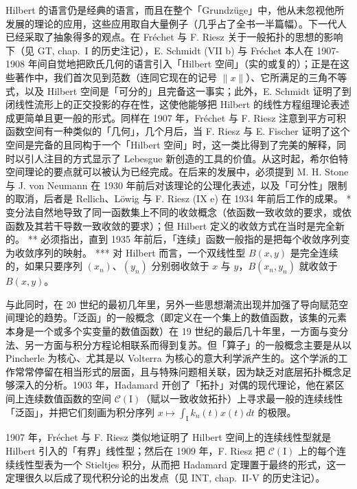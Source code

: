 Hilbert 的语言仍是经典的语言，而且在整个「Grundzüge」中，他从未忽视他所发展的理论的应用，这些应用取自大量例子（几乎占了全书一半篇幅）。下一代人已经采取了抽象得多的观点。在 Fréchet 与 F. Riesz 关于一般拓扑的思想的影响下（见 GT, chap.~I 的历史注记），E. Schmidt (VII b) 与 Fréchet 本人在 1907-1908 年间自觉地把欧氏几何的语言引入「Hilbert 空间」（实的或复的）；正是在这些著作中，我们首次见到范数（连同它现在的记号 \(\| x \|\)）、它所满足的三角不等式，以及 Hilbert 空间是「可分的」且完备这一事实；此外，E. Schmidt 证明了到闭线性流形上的正交投影的存在性，这使他能够把 Hilbert 的线性方程组理论表述成更简单且更一般的形式。同样在 1907 年，Fréchet 与 F. Riesz 注意到平方可积函数空间有一种类似的「几何」，几个月后，当 F. Riesz 与 E. Fischer 证明了这个空间是完备的且同构于一个「Hilbert 空间」时，这一类比得到了完美的解释，同时以引人注目的方式显示了 Lebesgue 新创造的工具的价值。从这时起，希尔伯特空间理论的要点就可以被认为已经完成。在后来的发展中，必须提到 M. H. Stone 与 J. von Neumann 在 1930 年前后对该理论的公理化表述，以及「可分性」限制的取消，后者是 Rellich、Löwig 与 F. Riesz (IX e) 在 1934 年前后工作的成果。
* 变分法自然地导致了同一函数集上不同的收敛概念（依函数一致收敛的要求，或依函数及其若干导数一致收敛的要求）；但 Hilbert 定义的收敛方式在当时是完全新的。
** 必须指出，直到 1935 年前后，「连续」函数一般指的是把每个收敛序列变为收敛序列的映射。
*** 对 Hilbert 而言，一个双线性型 \(B(x, y)\) 是完全连续的，如果只要序列 \((x_{n})\)、\((y_{n})\) 分别弱收敛于 \(x\) 与 \(y\)，\(B(x_{n}, y_{n})\) 就收敛于 \(B(x, y)\)。

与此同时，在 20 世纪的最初几年里，另外一些思想潮流出现并加强了导向赋范空间理论的趋势。「泛函」的一般概念（即定义在一个集上的数值函数，该集的元素本身是一个或多个实变量的数值函数）在 19 世纪的最后几十年里，一方面与变分法、另一方面与积分方程论相联系而得到复苏。但「算子」的一般概念主要是从以 Pincherle 为核心、尤其是以 Volterra 为核心的意大利学派产生的。这个学派的工作常常停留在相当形式的层面，且与特殊问题相关联，因为缺乏对底层拓扑概念足够深入的分析。1903 年，Hadamard 开创了「拓扑」对偶的现代理论，他在紧区间上连续数值函数的空间 \(\mathcal{C}(\mathrm{I})\)（赋以一致收敛拓扑）上寻求最一般的连续线性「泛函」，并把它们刻画为积分序列 \(x\mapsto \int_{\mathrm{I}}k_n(t)x(t)dt\) 的极限。

1907 年，Fréchet 与 F. Riesz 类似地证明了 Hilbert 空间上的连续线性型就是 Hilbert 引入的「有界」线性型；然后在 1909 年，F. Riesz 把 \(\mathcal{C}(\mathrm{I})\) 上的每个连续线性型表为一个 Stieltjes 积分，从而把 Hadamard 定理置于最终的形式，这一定理很久以后成了现代积分论的出发点（见 INT, chap.~II-V 的历史注记）。

